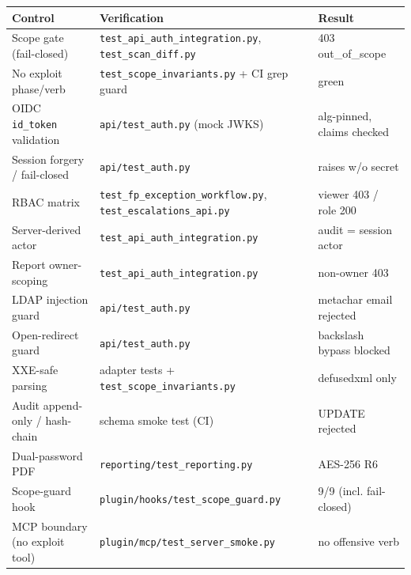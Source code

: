 \documentclass[11pt,a4paper]{article}
\newcommand{\code}[1]{\texttt{#1}}
\begin{document}
\begin{longtable}{L{4.6cm} L{6.0cm} L{3.5cm}}
\toprule
\textbf{Control} & \textbf{Verification} & \textbf{Result} \\
\midrule
\endhead
Scope gate (fail-closed) & \code{test\_api\_auth\_integration.py},
\code{test\_scan\_diff.py} & 403 out\_of\_scope \\
\addlinespace
No exploit phase/verb & \code{test\_scope\_invariants.py} + CI grep guard & green \\
\addlinespace
OIDC \code{id\_token} validation & \code{api/test\_auth.py} (mock JWKS) & alg-pinned, claims checked \\
\addlinespace
Session forgery / fail-closed & \code{api/test\_auth.py} & raises w/o secret \\
\addlinespace
RBAC matrix & \code{test\_fp\_exception\_workflow.py}, \code{test\_escalations\_api.py} & viewer 403 / role 200 \\
\addlinespace
Server-derived actor & \code{test\_api\_auth\_integration.py} & audit = session actor \\
\addlinespace
Report owner-scoping & \code{test\_api\_auth\_integration.py} & non-owner 403 \\
\addlinespace
LDAP injection guard & \code{api/test\_auth.py} & metachar email rejected \\
\addlinespace
Open-redirect guard & \code{api/test\_auth.py} & backslash bypass blocked \\
\addlinespace
XXE-safe parsing & adapter tests + \code{test\_scope\_invariants.py} & defusedxml only \\
\addlinespace
Audit append-only / hash-chain & schema smoke test (CI) & UPDATE rejected \\
\addlinespace
Dual-password PDF & \code{reporting/test\_reporting.py} & AES-256 R6 \\
\addlinespace
Scope-guard hook & \code{plugin/hooks/test\_scope\_guard.py} & 9/9 (incl. fail-closed) \\
\addlinespace
MCP boundary (no exploit tool) & \code{plugin/mcp/test\_server\_smoke.py} & no offensive verb \\
\bottomrule
\end{longtable}
\end{document}
